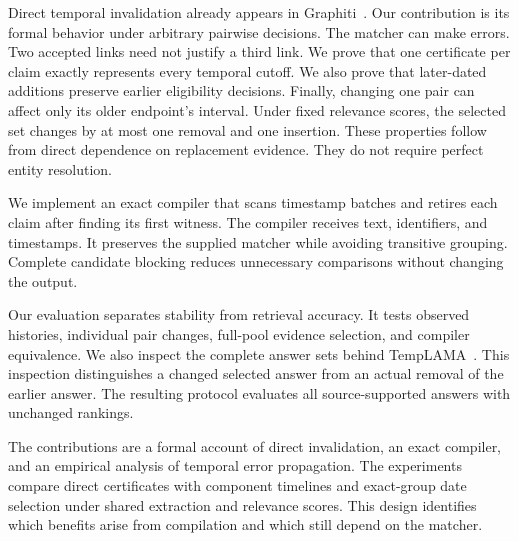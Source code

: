 Direct temporal invalidation already appears in Graphiti~\citep{rasmussen2025zep}.
Our contribution is its formal behavior under arbitrary pairwise decisions.
The matcher can make errors.
Two accepted links need not justify a third link.
We prove that one certificate per claim exactly represents every temporal cutoff.
We also prove that later-dated additions preserve earlier eligibility decisions.
Finally, changing one pair can affect only its older endpoint's interval.
Under fixed relevance scores, the selected set changes by at most one removal and one insertion.
These properties follow from direct dependence on replacement evidence.
They do not require perfect entity resolution.

We implement an exact compiler that scans timestamp batches and retires each claim after finding its first witness.
The compiler receives text, identifiers, and timestamps.
It preserves the supplied matcher while avoiding transitive grouping.
Complete candidate blocking reduces unnecessary comparisons without changing the output.

Our evaluation separates stability from retrieval accuracy.
It tests observed histories, individual pair changes, full-pool evidence selection, and compiler equivalence.
We also inspect the complete answer sets behind TempLAMA~\citep{dhingra2022templama}.
This inspection distinguishes a changed selected answer from an actual removal of the earlier answer.
The resulting protocol evaluates all source-supported answers with unchanged rankings.

The contributions are a formal account of direct invalidation, an exact compiler, and an empirical analysis of temporal error propagation.
The experiments compare direct certificates with component timelines and exact-group date selection under shared extraction and relevance scores.
This design identifies which benefits arise from compilation and which still depend on the matcher.

